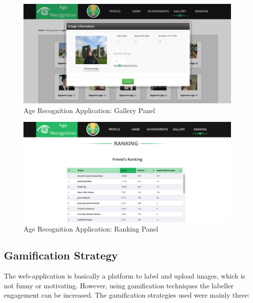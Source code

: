 \begin{figure}[!h]
	\centering
	\includegraphics[width=\textwidth]{figures/age_app_2}
	\caption{Age Recognition Application: Gallery Panel}
	\label{fig:gallery}
\end{figure}

\begin{figure}[!h]
	\centering
	\includegraphics[width=\textwidth]{figures/age_app_3}
	\caption{Age Recognition Application: Ranking Panel}
	\label{fig:ranking}
\end{figure}

\subsection{Gamification Strategy}
The web-application is basically a platform to label and upload images, which is not funny or motivating. However, using gamification techniques the labeller engagement can be increased. The gamification strategies used were mainly three:

